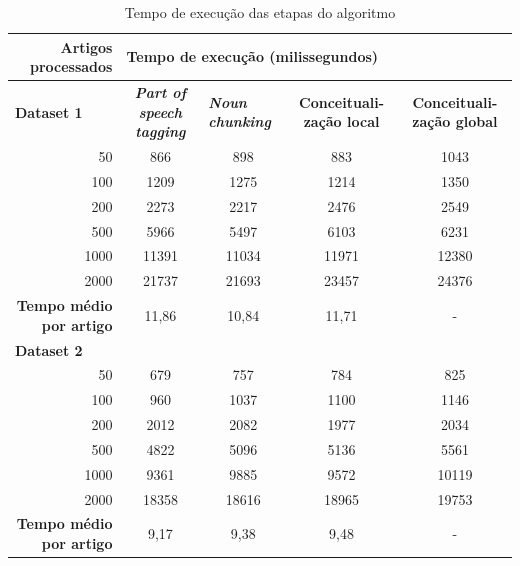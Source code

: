 \begin{table}[htbp]
\center
\begin{tabular}{|r|c|c|c|c|c|}
\hline
\multicolumn{1}{|p{3cm}|}{\textbf{Artigos \mbox{processados}}} & \multicolumn{ 5}{l|}{\textbf{Tempo de execução (milissegundos)}} \\ \hline
\multicolumn{1}{|l|}{\textbf{Dataset 1}} & \multicolumn{1}{p{3cm}|}{\textbf{\textit{Part of speech tagging}}} & \multicolumn{1}{l|}{\textbf{\textit{Noun chunking}}} & \multicolumn{1}{p{3cm}|}{\textbf{Conceituali- zação local}} & \multicolumn{ 2}{p{3cm}|}{\textbf{Conceituali- zação global}} \\ \hline
50 & 866 & 898 & 883 & \multicolumn{ 2}{c|}{1043} \\ \hline
100 & 1209 & 1275 & 1214 & \multicolumn{ 2}{c|}{1350} \\ \hline
200 & 2273 & 2217 & 2476 & \multicolumn{ 2}{c|}{2549} \\ \hline
500 & 5966 & 5497 & 6103 & \multicolumn{ 2}{c|}{6231} \\ \hline
1000 & 11391 & 11034 & 11971 & \multicolumn{ 2}{c|}{12380} \\ \hline
2000 & 21737 & 21693 & 23457 & \multicolumn{ 2}{c|}{24376} \\ \hline
\multicolumn{1}{|p{3cm}|}{\textbf{Tempo médio por artigo}} & 11,86 & 10,84 & 11,71 & \multicolumn{ 2}{c|}{-} \\ \hline
\multicolumn{ 6}{|l|}{\textbf{Dataset 2}} \\ \hline
50 & 679 & 757 & 784 & \multicolumn{ 2}{c|}{825} \\ \hline
100 & 960 & 1037 & 1100 & \multicolumn{ 2}{c|}{1146} \\ \hline
200 & 2012 & 2082 & 1977 & \multicolumn{ 2}{c|}{2034} \\ \hline
500 & 4822 & 5096 & 5136 & \multicolumn{ 2}{c|}{5561} \\ \hline
1000 & 9361 & 9885 & 9572 & \multicolumn{ 2}{c|}{10119} \\ \hline
2000 & 18358 & 18616 & 18965 & \multicolumn{ 2}{c|}{19753} \\ \hline
\multicolumn{1}{|p{3cm}|}{\textbf{Tempo médio por artigo}} & 9,17 & 9,38 & 9,48 & \multicolumn{ 2}{c|}{-} \\ \hline
\end{tabular}
\caption{Tempo de execução das etapas do algoritmo}
\label{tab:temposExecucaoBSR}
\end{table}


